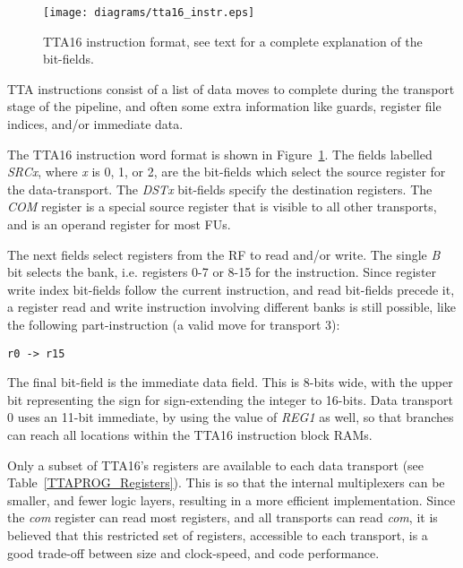 \begin{figure}[h!]
\begin{center}
\texttt{[image: diagrams/tta16\_instr.eps]}
\caption[TTA16 instruction format]{TTA16 instruction format, see text for a
complete explanation of the bit-fields.}
\label{TTAPROG_Instruction_Format}
\end{center}
\end{figure}

TTA instructions consist of a list of data moves to complete during the
transport stage of the pipeline, and often some extra information like
guards\cite{corporaal1993maa}, register file indices, and/or immediate data.

The TTA16 instruction word format is shown in
Figure~\ref{TTAPROG_Instruction_Format}. The fields labelled \textit{SRCx},
where \textit{x} is 0, 1, or 2, are the bit-fields which select the
source register for the data-transport. The \textit{DSTx} bit-fields specify
the destination registers. The \textit{COM} register is a special source
register that is visible to all other transports, and is an operand register
for most FUs.

The next fields select registers from the RF to read and/or write. The single
\textit{B} bit selects the bank, i.e. registers 0-7 or 8-15 for the
instruction. Since register write index bit-fields follow the current
instruction, and read bit-fields precede it, a register read and write
instruction involving different banks is still possible, like the following
part-instruction (a valid move for transport 3):
\begin{center}
\texttt{r0	-> r15}
\end{center}

The final bit-field is the immediate data field. This is 8-bits wide, with the
upper bit representing the sign for sign-extending the integer to 16-bits. Data
transport 0 uses an 11-bit immediate, by using the value of \textit{REG1} as
well, so that branches can reach all locations within the TTA16 instruction
block RAMs.

Only a subset of TTA16's registers are available to each data transport (see
Table~\ref{TTAPROG_Registers}). This is so that the internal multiplexers can be
smaller, and fewer logic layers, resulting in a more efficient implementation.
Since the \textit{com} register can read most registers, and all transports can
read \textit{com}, it is believed that this restricted set of registers,
accessible to each transport, is a good trade-off between size and clock-speed,
and code performance.

